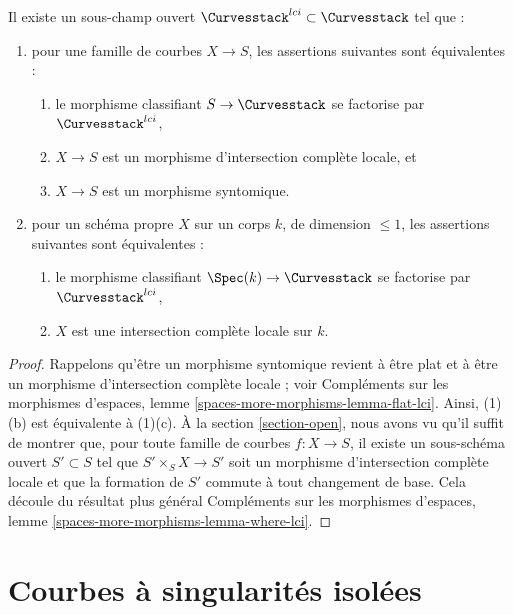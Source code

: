 \begin{lemma}
\label{lemma-lci-curves}
Il existe un sous-champ ouvert $\Curvesstack^{lci} \subset \Curvesstack$
tel que :
\begin{enumerate}
\item pour une famille de courbes $X \to S$, les assertions suivantes sont équivalentes :
\begin{enumerate}
\item le morphisme classifiant $S \to \Curvesstack$ se factorise par
$\Curvesstack^{lci}$,
\item $X \to S$ est un morphisme d'intersection complète locale, et
\item $X \to S$ est un morphisme syntomique.
\end{enumerate}
\item pour un schéma propre $X$ sur un corps $k$, de dimension $\leq 1$,
les assertions suivantes sont équivalentes :
\begin{enumerate}
\item le morphisme classifiant $\Spec(k) \to \Curvesstack$ se factorise
par $\Curvesstack^{lci}$,
\item $X$ est une intersection complète locale sur $k$.
\end{enumerate}
\end{enumerate}
\end{lemma}

\begin{proof}
Rappelons qu'être un morphisme syntomique revient à être plat et à être
un morphisme d'intersection complète locale ; voir
Compléments sur les morphismes d'espaces, lemme \ref{spaces-more-morphisms-lemma-flat-lci}.
Ainsi, (1)(b) est équivalente à (1)(c).
À la section \ref{section-open}, nous avons vu
qu'il suffit de montrer que, pour toute famille de courbes
$f : X \to S$, il existe un sous-schéma ouvert $S' \subset S$
tel que $S' \times_S X \to S'$ soit un morphisme d'intersection complète
locale et que la formation de $S'$ commute à tout changement de base.
Cela découle du résultat plus général
Compléments sur les morphismes d'espaces, lemme \ref{spaces-more-morphisms-lemma-where-lci}.
\end{proof}




\section{Courbes à singularités isolées}
\label{section-curves-isolated}

